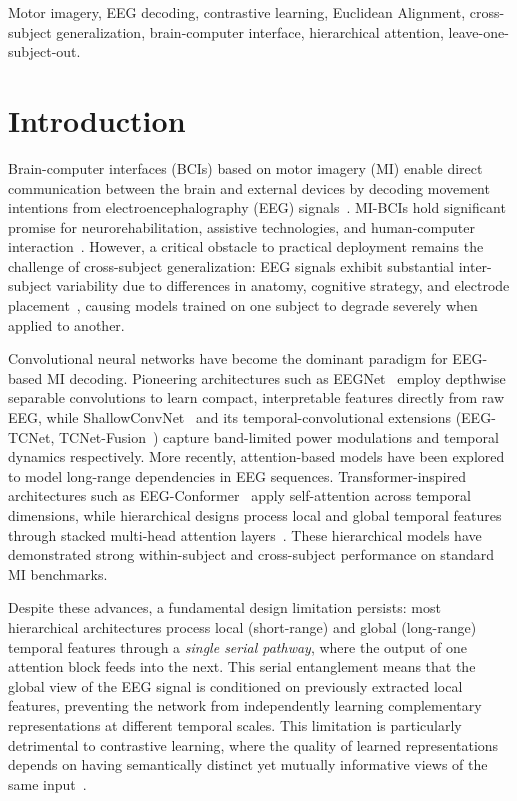 \documentclass[conference]{IEEEtran}
\begin{document}
\begin{IEEEkeywords}
Motor imagery, EEG decoding, contrastive learning, Euclidean Alignment, cross-subject generalization, brain-computer interface, hierarchical attention, leave-one-subject-out.
\end{IEEEkeywords}

\section{Introduction}

Brain-computer interfaces (BCIs) based on motor imagery (MI) enable direct communication between the brain and external devices by decoding movement intentions from electroencephalography (EEG) signals~\cite{wolpaw2002bci}.
MI-BCIs hold significant promise for neurorehabilitation, assistive technologies, and human-computer interaction~\cite{ang2010bci, blankertz2010bci}.
However, a critical obstacle to practical deployment remains the challenge of cross-subject generalization: EEG signals exhibit substantial inter-subject variability due to differences in anatomy, cognitive strategy, and electrode placement~\cite{lotte2018review}, causing models trained on one subject to degrade severely when applied to another.

Convolutional neural networks have become the dominant paradigm for EEG-based MI decoding.
Pioneering architectures such as EEGNet~\cite{lawhern2018eegnet} employ depthwise separable convolutions to learn compact, interpretable features directly from raw EEG, while ShallowConvNet~\cite{schirrmeister2017deep} and its temporal-convolutional extensions (EEG-TCNet, TCNet-Fusion~\cite{ingolfsson2020eeg}) capture band-limited power modulations and temporal dynamics respectively.
More recently, attention-based models have been explored to model long-range dependencies in EEG sequences.
Transformer-inspired architectures such as EEG-Conformer~\cite{song2023eeg} apply self-attention across temporal dimensions, while hierarchical designs process local and global temporal features through stacked multi-head attention layers~\cite{altuwairqi2022gah}.
These hierarchical models have demonstrated strong within-subject and cross-subject performance on standard MI benchmarks.

Despite these advances, a fundamental design limitation persists: most hierarchical architectures process local (short-range) and global (long-range) temporal features through a \emph{single serial pathway}, where the output of one attention block feeds into the next.
This serial entanglement means that the global view of the EEG signal is conditioned on previously extracted local features, preventing the network from independently learning complementary representations at different temporal scales.
This limitation is particularly detrimental to contrastive learning, where the quality of learned representations depends on having semantically distinct yet mutually informative views of the same input~\cite{chen2020simclr, khosla2020supcon}.
\end{document}
